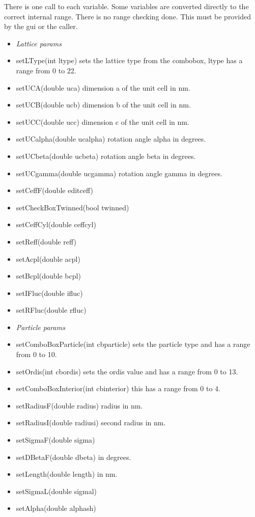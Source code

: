 \documentclass[11pt]{article} %
\begin{document}
There is one call to each variable. Some variables are converted directly to the correct internal range. There is no range checking done. This must be provided by the gui or the caller.
\begin{itemize}\itemsep0pt
%
\item[] {\it Lattice params}
\item setLType(int ltype) sets the lattice type from the combobox, ltype has a range from 0 to 22.
\item setUCA(double uca) dimension a of the unit cell in nm.
\item setUCB(double ucb) dimension b of the unit cell in nm.
\item setUCC(double ucc) dimension c of the unit cell in nm.
\item setUCalpha(double ucalpha) rotation angle alpha in degrees.
\item setUCbeta(double ucbeta) rotation angle beta in degrees.
\item setUCgamma(double ucgamma) rotation angle gamma in degrees.
\item setCeffF(double editceff)
\item setCheckBoxTwinned(bool twinned)
\item setCeffCyl(double ceffcyl)
\item setReff(double reff)
\item setAcpl(double acpl)
\item setBcpl(double bcpl)
\item setIFluc(double ifluc)
\item setRFluc(double rfluc)
% 
\item[] {\it Particle params}
\item setComboBoxParticle(int cbparticle) sets the particle type and has a range from 0 to 10.
\item setOrdis(int cbordis) sets the ordis value and has a range from 0 to 13.
\item setComboBoxInterior(int cbinterior) this has a range from 0 to 4.
\item setRadiusF(double radius) radius in nm.
\item setRadiusI(double radiusi) second radius in nm.
\item setSigmaF(double sigma)
\item setDBetaF(double dbeta) in degrees.
\item setLength(double length) in nm.
\item setSigmaL(double sigmal)
\item setAlpha(double alphash)

\end{itemize}
\end{document}
